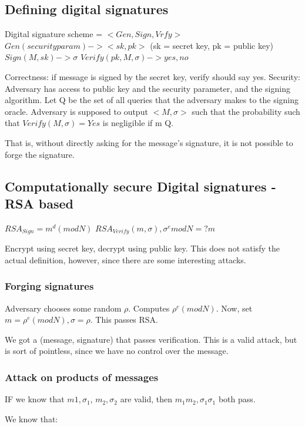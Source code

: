 \documentclass[11pt]{article}
\begin{document}
\begin{Itemize}
\begin{Itemize}
\subsection{Defining digital signatures}
Digital signature scheme = $<Gen, Sign, Vrfy>$
$Gen(security param) -> <sk, pk>$ (sk = secret key, pk = public key)
$Sign(M, sk) -> \sigma$
$Verify(pk, M, \sigma) -> {yes, no}$

Correctness: if message is signed by the secret key, verify should say yes.
Security: Adversary has access to public key and the security parameter, and the signing algorithm.
          Let Q be the set of all queries that the adversary makes to the signing oracle.
Adversary is supposed to output $<M, \sigma>$ such that the probability such that
$Verify(M, \sigma) = Yes$ is negligible if m \notin Q.

That is, without directly asking for the message's signature, it is not possible to forge the signature.



\subsection{Computationally secure Digital signatures - RSA based}

$RSA_{Sign} = m^d (mod N)$
$RSA_{Verify}(m, \sigma), \sigma ^e mod N =? m$

Encrypt using secret key, decrypt using public key.
This does not satisfy the actual definition, however, since there are some interesting attacks.


\subsubsection{Forging signatures}
Adversary chooses some random $\rho$. Computes $\rho^e (mod N)$.
Now, set $m = \rho^e (mod N), \sigma = \rho$. This passes RSA.

We got a (message, signature) that passes verification. This is a valid attack, but is sort of pointless,
since we have no control over the message.

\subsubsection{Attack on products of messages}

IF we know that $m1, \sigma_1$, $m_2, \sigma_2$ are valid, then
$m_1 m_2, \sigma_1 \sigma_1$ both pass.

We know that:


\end{Itemize}
\end{Itemize}
\end{document}

